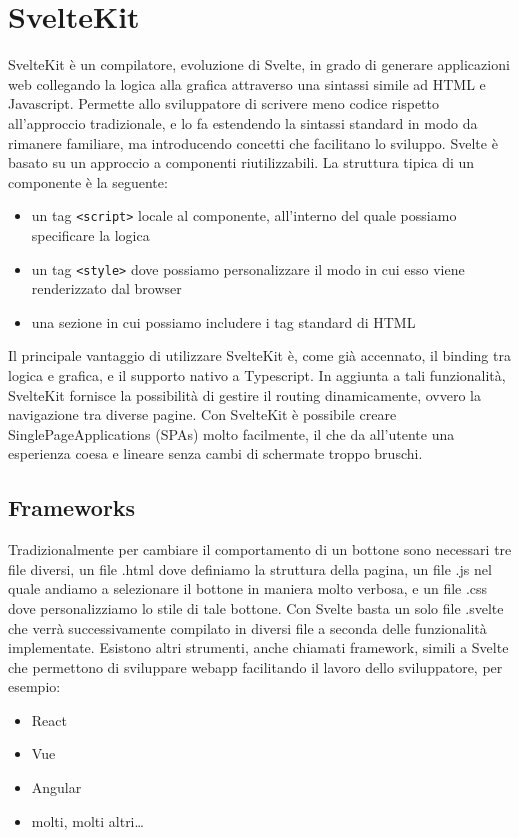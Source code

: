 \section{SvelteKit}
SvelteKit è un compilatore, evoluzione di Svelte, in grado di generare applicazioni web collegando la logica alla grafica attraverso una sintassi simile ad HTML e Javascript.
Permette allo sviluppatore di scrivere meno codice rispetto all'approccio tradizionale, e lo fa estendendo la sintassi standard in modo da rimanere familiare, ma introducendo concetti che facilitano lo sviluppo.
Svelte è basato su un approccio a componenti riutilizzabili. La struttura tipica di un componente è la seguente:

\begin{itemize}
    \item un tag \lstinline{<script>} locale al componente, all'interno del quale possiamo specificare la logica
    \item un tag \lstinline{<style>} dove possiamo personalizzare il modo in cui esso viene renderizzato dal browser
    \item una sezione in cui possiamo includere i tag standard di HTML
\end{itemize}

Il principale vantaggio di utilizzare SvelteKit è, come già accennato, il binding tra logica e grafica, e il supporto nativo a Typescript.
In aggiunta a tali funzionalità, SvelteKit fornisce la possibilità di gestire il routing dinamicamente, ovvero la navigazione tra diverse pagine.
Con SvelteKit è possibile creare SinglePageApplications (SPAs) molto facilmente, il che da all'utente una esperienza coesa e lineare senza cambi di schermate troppo bruschi.
\subsection{Frameworks}
Tradizionalmente per cambiare il comportamento di un bottone sono necessari tre file diversi, un file .html dove definiamo la struttura della pagina, un file .js nel quale andiamo a selezionare il bottone in maniera molto verbosa, e un file .css dove personalizziamo lo stile di tale bottone.
Con Svelte basta un solo file .svelte che verrà successivamente compilato in diversi file a seconda delle funzionalità implementate.
Esistono altri strumenti, anche chiamati framework, simili a Svelte che permettono di sviluppare webapp facilitando il lavoro dello sviluppatore, per esempio:

\begin{itemize}
    \item React
    \item Vue
    \item Angular
    \item molti, molti altri\dots
\end{itemize}

